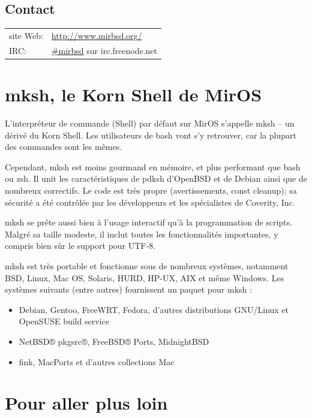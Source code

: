 \documentclass[a4paper,landscape,11pt,notumble]{leaflet}
\begin{document}
\subsection{Contact}
{\large
\begin{tabular}{ll}
site Web: & \textcolor{darkred}{\url{http://www.mirbsd.org/}}\\
IRC: & \textcolor{darkred}{\url{#mirbsd}} sur irc.freenode.net\\
\end{tabular}
\par}
\vspace{3ex}%
\graybox

\newpage

\section{mksh, le Korn Shell de MirOS}

\noindent
L’interpréteur de commande (Shell) par défaut sur MirOS s’appelle mksh – un dérivé du Korn Shell. Les utilisateurs de bash vont s’y retrouver, car la plupart des commandes sont les mêmes.

Cependant, mksh est moins gourmand en mémoire, et plus performant que bash ou zsh. Il unit les caractéristiques de pdksh d’OpenBSD et de Debian ainsi que de nombreux correctifs. Le code est très propre (avertissements, const cleanup); sa sécurité a été contrôlée par les développeurs et les spécialistes de Coverity, Inc.

mksh se prête aussi bien à l’usage interactif qu’à la programmation de scripts. Malgré sa taille modeste, il inclut toutes les fonctionnalités importantes, y compris bien sûr le support pour UTF-8.

mksh est très portable et fonctionne sous de nombreux systèmes, notamment BSD, Linux, Mac OS, Solaris, HURD, HP-UX, AIX et même Windows. Les systèmes suivants (entre autres) fournissent un paquet pour mksh :

\begin{itemize}
\item Debian, Gentoo, FreeWRT, Fedora, d’autres distributions GNU/Linux et OpenSUSE build service
\item NetBSD® pkgsrc®, FreeBSD® Ports, MidnightBSD
\item fink, MacPorts et d’autres collections Mac
\end{itemize}

\section{Pour aller plus loin}
\end{document}
